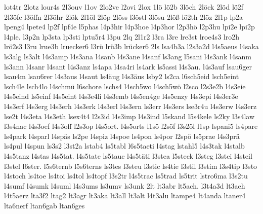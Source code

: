 {    lot4tr
    2lotz
    lour4s
    2l3ouv
    l1ov
    2lo2ve
    l2ovi
    2lox
    1lö
    lö2b
    3löch
    2löck
    2löd
    lö2f
    2l3öfe
    l3öffn
    2l3öhr
    2lök
    2l1öl
    2löp
    2löss
    l3östl
    3lösu
    2löß
    lö2th
    2löz
    2l1p
    lp2a
    lpeng4
    lpete4
    lp2f
    lpf4e
    l5phas
    l4p3hir
    l4p3hoe
    l4p3hor
    l2p3hö
    l2p3hu
    lpi2e
    lpi2p
    l4ple.
    l3p2n
    lp3sta
    lp3sti
    lptu5r4
    l3pu
    2lq
    2l1r2
    l3ra
    l3re
    lre3st
    lroe4s3
    lro2h
    lrö2s3
    l3ru
    lrue3b
    lruecker6
    l3rü
    lrü3b
    lrücker6
    2ls
    lsa4b3a
    l2s3a2d
    l4s5aeus
    l4saka
    ls3alg
    ls3alt
    l4s3amp
    l4s3ana
    l4sanb
    l4s3ane
    l4sanf
    ls3ang
    l5sani
    l4s3ank
    l4sanm
    ls3ann
    l4sanr
    l4sant
    l4s3anz
    ls4apa
    l4sa4ri
    ls4ark
    ls5assi
    l4s3au.
    l4s3auf
    lsau6ger
    lsau4m
    lsau6rer
    l4s3aus
    l4saut
    ls4äug
    l4s3äus
    lsby2
    ls2ca
    l6sch5eid
    lsch5eint
    lsch4le
    lsch4lo
    l4schmü
    l6schore
    lschs4
    l4sch5wo
    l4sch5wö
    l2sco
    l2s3e2b
    l4s3eie
    l4s5eind
    ls5einf
    l4s5eint
    l4s3e4li
    l4s3emb
    l4s5en4ge
    l4s5enzy
    l4s3epi
    l4s3er3e
    l4s3erf
    l4s3erg
    l4s3erh
    l4s3erk
    l4s3erl
    l4s3ern
    ls3err
    l4s3ers
    lse3r4u
    l4s3erw
    l4s3erz
    lse2t
    l4s3eta
    l4s3eth
    lsex4t4
    l2s3id
    l4s3imp
    l4s3ind
    l5skand
    l5s4kele
    ls2ky
    l3s4law
    l3s4nac
    l4s3oef
    l4s3off
    l2s3op
    l4s5ort.
    l4s5orts
    l1sö
    l2söf
    l3s2öl
    l1sp
    lspani5
    ls4pare
    ls4park
    l4sparl
    l4späs
    ls2pe
    l4spiz
    l4spoe
    ls4pon
    ls4por
    l2spö
    ls5prae
    l4s3prä
    ls4pul
    l4spun
    ls3s2
    l3st2a
    lstab4
    ls5tabl
    l6s5taeti
    l4stag
    lstahl5
    l4s3tak
    l4stalb
    l4s5tanz
    l4stas
    l4s5tat.
    l4s5tate
    ls5tauc
    l4s5täti
    l3stea
    l5steck
    l3steg
    l3stei
    l4steil
    l3stel
    l6ster.
    l5s6ternb
    l5s6terns
    ls3tes
    l3steu
    l3stic
    ls4tie
    l3stil
    l3stim
    l3s4tip
    l3sto
    l4stoch
    ls4toe
    ls4toi
    ls4tol
    ls4topf
    l3s2tr
    l4s5trac
    ls5trad
    ls5trit
    lstro6ma
    l3s2tu
    l4sumf
    l4sumk
    l4suml
    l4s3ums
    ls3umv
    ls3unk
    2lt
    lt3abr
    lt5ach.
    l3t4a3d
    lt3aeh
    l4t5aerz
    lta3f2
    ltag2
    lt3agr
    lt3aka
    lt3all
    lt3alt
    l4t3alu
    ltampe4
    lt4anda
    ltaner4
    lta6nerf
    ltan6gab
    ltan6ges
}
